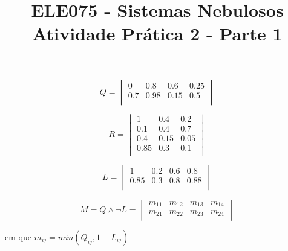 \documentclass[conference]{IEEEtran}
\begin{document}
\title{ELE075 - Sistemas Nebulosos\\ Atividade Prática 2 - Parte 1
}

\author{
}

\maketitle


\section{}  %

\[
Q = 
\begin{vmatrix}
0 & 0.8 & 0.6 & 0.25 \\
0.7 & 0.98 & 0.15 & 0.5 \\
\end{vmatrix}
\]

\[
R = 
\begin{vmatrix}
1 & 0.4 & 0.2 \\
0.1 & 0.4 & 0.7 \\
0.4 & 0.15 & 0.05 \\
0.85 & 0.3 & 0.1 \\
\end{vmatrix}
\]

\[
L = 
\begin{vmatrix}
1 & 0.2 & 0.6 & 0.8 \\
0.85 & 0.3 & 0.8 & 0.88 \\
\end{vmatrix}
\]

\hfill


\hspace{1cm}

\[
M = Q \wedge \neg L = 
\begin{vmatrix}
m_{11} & m_{12} & m_{13} & m_{14} \\
m_{21} & m_{22} & m_{23} & m_{24} \\
\end{vmatrix}
\]

\hspace{1cm}

em que $m_{ij} = min(Q_{ij}, 1 - L_{ij})$
\end{document}
